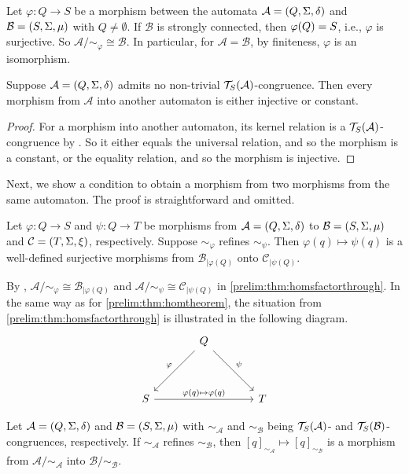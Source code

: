 \begin{corollary}	\label{prelim:cor:homtheorem}
	Let $\varphi \colon Q \to S$ be a morphism
	between the automata $\mathcal A = (Q, \Sigma, \delta)$
	and $\mathcal B = (S, \Sigma, \mu)$ with $Q \ne \emptyset$.
	If $\mathcal B$ is strongly connected, 
	then $\varphi(Q) = S$, i.e., $\varphi$ is surjective. So $\mathcal A / {\sim_{\varphi}} \cong \mathcal B$. 
	In particular, for $\mathcal A = \mathcal B$,
	by finiteness, $\varphi$ is an isomorphism.	
\end{corollary}

\begin{corollary}
  Suppose $\mathcal A = (Q, \Sigma, \delta)$ admits
  no non-trivial $\mathcal T_S(\mathcal A)$-congruence.
  Then every morphism from $\mathcal A$ into another automaton
  is either injective or constant.  
\end{corollary}
\begin{proof}
  For a morphism into another automaton, its kernel relation
  is a $\mathcal T_S(\mathcal A)$-congruence by .
  So it either equals the universal relation, and so the morphism
  is a constant, or the equality relation, and so the morphism is injective.  
\end{proof}

Next, we show a condition to obtain a morphism from two morphisms
from the same automaton. The proof is straightforward and omitted.

\begin{theorem}
	\label{prelim:thm:homsfactorthrough}
	Let $\varphi \colon Q \to S$
	and $\psi \colon Q \to T$
	be morphisms
	from $\mathcal A = (Q, \Sigma, \delta)$
	to $\mathcal B = (S, \Sigma, \mu)$
	and $\mathcal C = (T, \Sigma, \xi)$, respectively.
	Suppose $\sim_{\varphi}$ refines $\sim_{\psi}$.
	Then $\varphi(q) \mapsto \psi(q)$
	is a well-defined surjective morphisms
	from $\mathcal B_{|\varphi(Q)}$
	onto $\mathcal C_{|\psi(Q)}$.
\end{theorem}

By ,
$\mathcal A / {\sim_{\varphi}} \cong \mathcal B_{|\varphi(Q)}$
and $\mathcal A / {\sim_{\psi}} \cong \mathcal C_{|\psi(Q)}$
in \cref{prelim:thm:homsfactorthrough}. 
In the same way as for \cref{prelim:thm:homtheorem}, the situation from \cref{prelim:thm:homsfactorthrough} is illustrated in the following diagram.
\[
\begin{tikzcd}[column sep=1.3cm, row sep=1.3cm]
	& Q \arrow[dl, swap, "\varphi"] \arrow[dr, "\psi"] & \\
	S \arrow{rr}{\varphi(q) \mapsto \varphi(q)} & & T
\end{tikzcd}
\]

\begin{corollary}
 Let $\mathcal A = (Q, \Sigma, \delta)$ and $\mathcal B = (S, \Sigma, \mu)$
 with $\sim_{\mathcal A}$ and $\sim_{\mathcal B}$
 being $\mathcal T_S(\mathcal A)$- and $\mathcal T_S(\mathcal B)$-congruences, respectively.
 If $\sim_{\mathcal A}$ refines $\sim_{\mathcal B}$,
 then $[q]_{\sim_{\mathcal A}} \mapsto [q]_{\sim_{\mathcal B}}$
 is a morphism from $\mathcal A / {\sim_{\mathcal A}}$
 into $\mathcal B  / {\sim_{\mathcal B}}$.	
\end{corollary}
